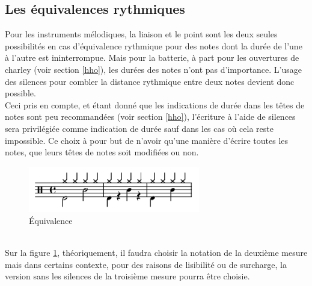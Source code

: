 \subsection*{Les équivalences rythmiques}
Pour les instruments mélodiques, la liaison et le point sont les deux seules possibilités en cas d’équivalence rythmique pour des notes dont la durée de l’une à l’autre est ininterrompue. Mais pour la batterie, à part pour les ouvertures de charley (voir section \ref{hho}), les durées des notes n’ont pas d’importance. L’usage des silences pour combler la distance rythmique entre deux notes devient donc possible.\\
Ceci pris en compte, et étant donné que les indications de durée dans les têtes de notes sont peu recommandées (voir section \ref{hho}), l’écriture à l’aide de silences sera privilégiée comme indication de durée sauf dans les cas où cela reste impossible. Ce choix à pour but de n’avoir qu’une manière d’écrire toutes les notes, que leurs têtes de notes soit modifiées ou non.
\begin{figure}[h]
	\centering
	\includegraphics[height=20mm, width=75mm]{z_images/3_methodes/0_notation_de_la_batterie/6_equivalence.png}
	\caption{Équivalence}
	\label{equivalence}
\end{figure}\\
Sur la figure \ref{equivalence}, théoriquement, il faudra choisir la notation de la deuxième mesure mais dans certains contexte, pour des raisons de lisibilité ou de surcharge, la version sans les silences de la troisième mesure pourra être choisie.
